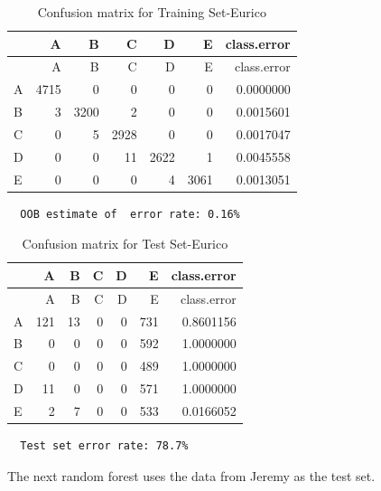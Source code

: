 \documentclass[12pt,twoside]{reedthesis}
\begin{document}
  \begin{longtable}[c]{@{}lrrrrrr@{}}
  \caption{Confusion matrix for Training Set-Eurico}\tabularnewline
  \toprule
  & A & B & C & D & E & class.error\tabularnewline
  \midrule
  \endfirsthead
  \toprule
  & A & B & C & D & E & class.error\tabularnewline
  \midrule
  \endhead
  A & 4715 & 0 & 0 & 0 & 0 & 0.0000000\tabularnewline
  B & 3 & 3200 & 2 & 0 & 0 & 0.0015601\tabularnewline
  C & 0 & 5 & 2928 & 0 & 0 & 0.0017047\tabularnewline
  D & 0 & 0 & 11 & 2622 & 1 & 0.0045558\tabularnewline
  E & 0 & 0 & 0 & 4 & 3061 & 0.0013051\tabularnewline
  \bottomrule
  \end{longtable}
  
  \begin{verbatim}
  OOB estimate of  error rate: 0.16%
  \end{verbatim}
  
  \begin{longtable}[c]{@{}lrrrrrr@{}}
  \caption{Confusion matrix for Test Set-Eurico}\tabularnewline
  \toprule
  & A & B & C & D & E & class.error\tabularnewline
  \midrule
  \endfirsthead
  \toprule
  & A & B & C & D & E & class.error\tabularnewline
  \midrule
  \endhead
  A & 121 & 13 & 0 & 0 & 731 & 0.8601156\tabularnewline
  B & 0 & 0 & 0 & 0 & 592 & 1.0000000\tabularnewline
  C & 0 & 0 & 0 & 0 & 489 & 1.0000000\tabularnewline
  D & 11 & 0 & 0 & 0 & 571 & 1.0000000\tabularnewline
  E & 2 & 7 & 0 & 0 & 533 & 0.0166052\tabularnewline
  \bottomrule
  \end{longtable}
  
  \begin{verbatim}
  Test set error rate: 78.7%
  \end{verbatim}
  
  \newpage
  
  The next random forest uses the data from Jeremy as the test set.
  
  \begin{Shaded}
  \begin{Highlighting}[]
  \NormalTok{(}\NormalTok{)}
  
  \StringTok{ }\NormalTok{wl2[wl2$user_name ==}\StringTok{ }\NormalTok{subjects[}\NormalTok{], ]}
  \StringTok{ }\NormalTok{wl2[wl2$user_name !=}\StringTok{ }\NormalTok{subjects[}\NormalTok{], ]}
  \StringTok{ }\NormalTok{(} \NormalTok{OtherSubs5[, }\NormalTok{:}\NormalTok{], } 
                                  \NormalTok{Sub5[, }\NormalTok{:}\NormalTok{], }
                                  
                                  \NormalTok{)}
  \end{Highlighting}
  \end{Shaded}
  
\end{document}
